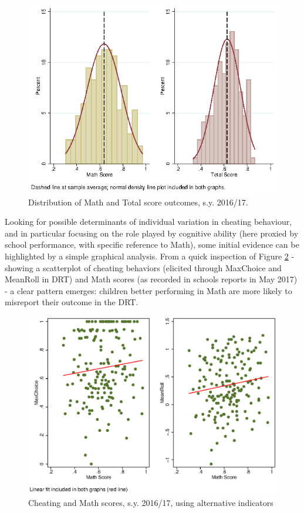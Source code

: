 \documentclass[authoryear, preprint, review, 12pt]{elsarticle}
\begin{document}
\begin{figure}[!h]
  \centering
	\includegraphics[width=.8\linewidth]{figures/hist_mathANDtot.eps} \caption{Distribution of Math and Total score outcomes, s.y. 2016/17.}\label{fig:performance}
\end{figure}

Looking for possible determinants of individual variation in cheating behaviour, and in particular focusing on the role played by cognitive ability (here proxied by school performance, with specific reference to Math), some initial evidence can be highlighted by a simple graphical analysis. From a quick inspection of Figure \ref{fig:cheatmath} - showing a scatterplot of cheating behaviors (elicited through MaxChoice and MeanRoll in DRT) and Math scores (as recorded in schools reports in May 2017) - a clear pattern emerges: children better performing in Math are more likely to misreport their outcome in the DRT.

\begin{figure}
	\centering
	\includegraphics{figures/cheat_max_math.eps}
	\caption{\label{fig:cheatmath}Cheating and Math scores, s.y. 2016/17, using alternative indicators}
\end{figure}
\end{document}
